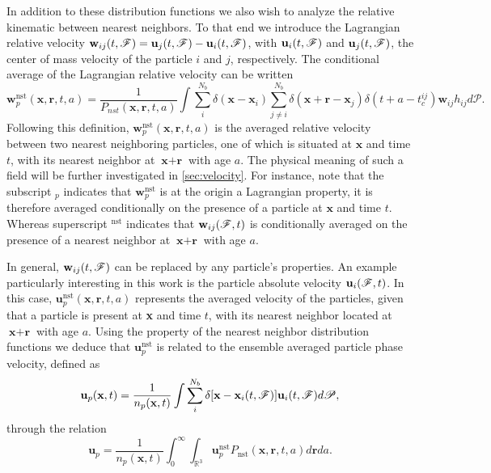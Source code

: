 In addition to these distribution functions we also wish to analyze the relative kinematic between nearest neighbors. 
To that end we introduce the Lagrangian relative velocity $\textbf{w}_{ij}(t,\mathscr{F}) = \textbf{u}_j(t,\mathscr{F}) - \textbf{u}_i(t,\mathscr{F})$, with $\textbf{u}_i(t,\mathscr{F})$ and $\textbf{u}_j(t,\mathscr{F})$, the center of mass velocity of the particle $i$ and $j$, respectively.
The conditional average of the Lagrangian relative velocity can be written
\begin{equation*}
    \textbf{w}^\text{nst}_p (\textbf{x},\textbf{r},t,a)
    = 
    \frac{1}{P_{nst}(\textbf{x},\textbf{r},t,a)}
    \int \sum_{i}^{N_b}\delta(\textbf{x}-\textbf{x}_i)
    \sum_{j\neq i}^{N_b}\delta(\textbf{x}+\textbf{r}-\textbf{x}_j) 
    \delta(t+a-t_c^{ij}) 
    \textbf{w}_{ij}
    h_{ij} 
    d\mathscr{P}.
    \label{eq:q_nstij}
\end{equation*}
Following this definition, $\textbf{w}^\text{nst}_p(\textbf{x},\textbf{r},t,a)$ is the averaged relative velocity between two nearest neighboring particles, one of which is situated at $\textbf{x}$ and time $t$, with its nearest neighbor at $\textbf{x}+\textbf{r}$ with age $a$. 
The physical meaning of such a field will be further investigated in \ref{sec:velocity}. 
For instance, note that the subscript $_p$ indicates that $\textbf{w}^\text{nst}_p$ is at the origin a Lagrangian property, it is therefore averaged conditionally on the presence of a particle at $\textbf{x}$ and time $t$. 
Whereas superscript $^\text{nst}$ indicates that $\textbf{w}_{ij}(\mathscr{F},t)$ is conditionally averaged on the presence of a nearest neighbor at $\textbf{x}+\textbf{r}$ with age $a$. 

In general, $\textbf{w}_{ij}(t,\mathscr{F})$ can be replaced by any particle's properties. 
An example particularly interesting in this work is the particle absolute velocity $\textbf{u}_i(\mathscr{F},t)$.
In this case, $\textbf{u}^\text{nst}_p(\textbf{x},\textbf{r},t,a)$ represents the averaged velocity of the particles, given that a particle is present at \textbf{x} and time $t$, with its nearest neighbor located at $\textbf{x}+\textbf{r}$ with age $a$. 
Using the property of the nearest neighbor distribution functions we deduce that  $\textbf{u}^\text{nst}_p$ is related to the ensemble averaged particle phase velocity, defined as 
\begin{equation*}
    \textbf{u}_p(\textbf{x},t)=\frac{1}{n_p(\textbf{x},t)} 
    \int \sum_{i}^{N_b}\delta[\textbf{x}-\textbf{x}_i(t,\mathscr{F})]  \textbf{u}_i(t,\mathscr{F})d\mathscr{P},
\end{equation*}
through the relation
\begin{equation}
    \textbf{u}_p = \frac{1}{n_p(\textbf{x},t)} \int_0^\infty \int_{\mathbb{R}^3} \textbf{u}_p^\text{nst} P_\text{nst}(\textbf{x},\textbf{r},t,a) d\textbf{r} da. 
    \label{eq:u_p}
\end{equation}




